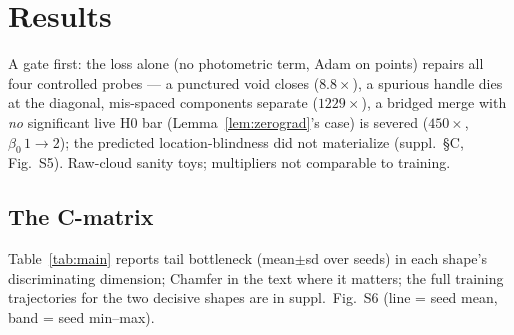 \section{Results}
\label{sec:results}


A gate first: the loss alone (no photometric term, Adam on points)
repairs all four controlled probes --- a punctured void closes
($8.8\times$), a spurious handle dies at the diagonal, mis-spaced
components separate ($1229\times$), a bridged merge with \emph{no}
significant live H0 bar (Lemma~\ref{lem:zerograd}'s case) is severed
($450\times$, $\beta_0\,1{\to}2$); the predicted location-blindness did
not materialize (suppl.\ \S C, Fig.~S5). Raw-cloud sanity toys;
multipliers not comparable to training.

\subsection{The C-matrix}
\label{sec:cmatrix}
Table~\ref{tab:main} reports tail bottleneck (mean$\pm$sd over seeds) in each
shape's discriminating dimension; Chamfer in the text where it matters;
the full training trajectories for the two decisive shapes are in
suppl.\ Fig.~S6 (line = seed mean, band = seed min--max).

